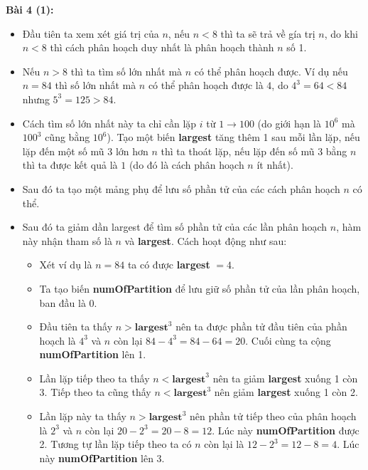 \documentclass[12pt]{article}
\begin{document}
\textbf{Bài 4 (1):}
\begin{itemize}
    \item Đầu tiên ta xem xét giá trị của $n$, nếu $n < 8$ thì ta sẽ trả về gía trị $n$, do khi $n < 8$ thì cách phân hoạch duy nhất là phân hoạch thành $n$ số 1.

    \item Nếu $n > 8$ thì ta tìm số lớn nhất mà $n$ có thể phân hoạch được. Ví dụ nếu $n = 84$ thì số lớn nhất mà $n$ có thể phân hoạch được là $4$, do $4^3 = 64 < 84$ nhưng $5^3 = 125 > 84$. 
    
    \item Cách tìm số lớn nhất này ta chỉ cần lặp $i$ từ $1 \to 100$ (do giới hạn là $10^6$ mà $100^3$ cũng bằng $10^6$). Tạo một biến \textbf{largest} tăng thêm 1 sau mỗi lần lặp, nếu lặp đến một số mũ 3 lớn hơn $n$ thì ta thoát lặp, nếu lặp đến số mũ 3 bằng $n$ thì ta được kết quả là $1$ (do đó là cách phân hoạch $n$ ít nhất).

    \item Sau đó ta tạo một mảng phụ để lưu số phần tử của các cách phân hoạch $n$ có thể.

    \item Sau đó ta giảm dần largest để tìm số phần tử của các lần phân hoạch $n$, hàm này nhận tham số là $n$ và \textbf{largest}. Cách hoạt động như sau:

    \begin{itemize}
        \item Xét ví dụ là $n = 84$ ta có được \textbf{largest} $= 4$.

        \item Ta tạo biến \textbf{numOfPartition} để lưu giữ số phần tử của lần phân hoạch, ban đầu là $0$.

        \item Đầu tiên ta thấy $n > \textbf{largest}^3$ nên ta được phần tử đầu tiên của phần hoạch là $4^3$ và $n$ còn lại $84 - 4^3 = 84 - 64 = 20$. Cuối cùng ta cộng \textbf{numOfPartition} lên 1.

        \item Lần lặp tiếp theo ta thấy $n < \textbf{largest}^3$ nên ta giảm \textbf{largest} xuống 1 còn 3. Tiếp theo ta cũng thấy $n < \textbf{largest}^3$ nên giảm \textbf{largest} xuống 1 còn 2.

        \item Lần lặp này ta thấy $n > \textbf{largest}^3$ nên phần tử tiếp theo của phân hoạch là $2^3$ và $n$ còn lại $20 - 2^3 = 20 - 8 = 12$. Lúc này \textbf{numOfPartition} được 2. Tương tự lần lặp tiếp theo ta có $n$ còn lại là $12 - 2^3 = 12 - 8 = 4$. Lúc này \textbf{numOfPartition} lên 3.


\end{itemize}
\end{itemize}
\end{document}
